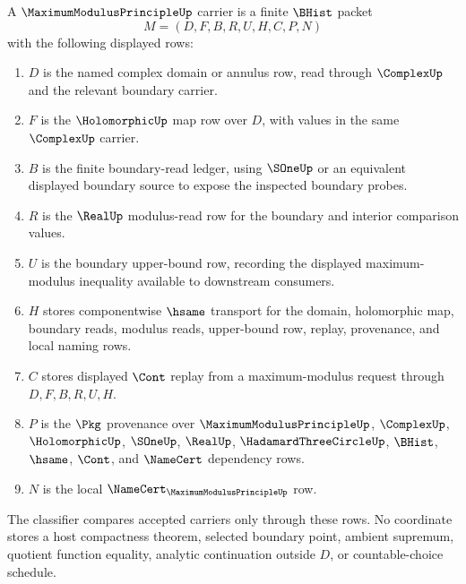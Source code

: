 \begin{definition}
\label{def:maximum-modulus-principle-carrier}
A $\MaximumModulusPrincipleUp$ carrier is a finite $\BHist$ packet
$$
M=(D,F,B,R,U,H,C,P,N)
$$
with the following displayed rows:
\begin{enumerate}
\item $D$ is the named complex domain or annulus row, read through $\ComplexUp$ and the relevant boundary carrier.
\item $F$ is the $\HolomorphicUp$ map row over $D$, with values in the same $\ComplexUp$ carrier.
\item $B$ is the finite boundary-read ledger, using $\SOneUp$ or an equivalent displayed boundary source to expose the inspected boundary probes.
\item $R$ is the $\RealUp$ modulus-read row for the boundary and interior comparison values.
\item $U$ is the boundary upper-bound row, recording the displayed maximum-modulus inequality available to downstream consumers.
\item $H$ stores componentwise $\hsame$ transport for the domain, holomorphic map, boundary reads, modulus reads, upper-bound row, replay, provenance, and local naming rows.
\item $C$ stores displayed $\Cont$ replay from a maximum-modulus request through $D,F,B,R,U,H$.
\item $P$ is the $\Pkg$ provenance over $\MaximumModulusPrincipleUp$, $\ComplexUp$, $\HolomorphicUp$, $\SOneUp$, $\RealUp$, $\HadamardThreeCircleUp$, $\BHist$, $\hsame$, $\Cont$, and $\NameCert$ dependency rows.
\item $N$ is the local $\NameCert_{\MaximumModulusPrincipleUp}$ row.
\end{enumerate}
The classifier compares accepted carriers only through these rows. No coordinate stores a host compactness theorem, selected boundary point, ambient supremum, quotient function equality, analytic continuation outside $D$, or countable-choice schedule.
\end{definition}

